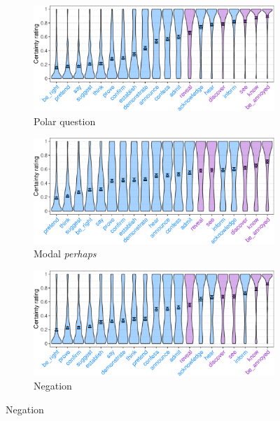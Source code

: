 \documentclass[a4paper,12pt,twoside]{article}
\begin{document}
\begin{figure}[h!]
\centering
\begin{subfigure}[t]{0.57\textwidth}
\includegraphics[width = 1\linewidth]{question-predicate-graph-1.pdf}
\caption{Polar question}\label{fig:op-pred-ratings-q}
\end{subfigure}

\medskip
\begin{subfigure}[t]{0.57\textwidth}
\includegraphics[width = 1\linewidth]{modal-predicate-graph-1.pdf}
\caption{Modal \emph{perhaps}}\label{fig:op-pred-ratings-m}
\end{subfigure}

\medskip
\begin{subfigure}[t]{0.57\textwidth}
\includegraphics[width = 1\linewidth]{negation-predicate-graph-1.pdf}
\caption{Negation}\label{fig:op-pred-ratings-n}
\end{subfigure}


\end{figure}
\end{document}

